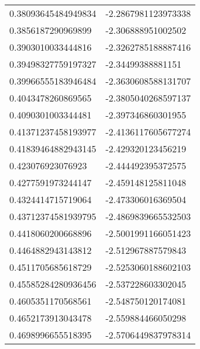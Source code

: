 \begin{supertabular}{ll}
0.38093645484949834 & -2.2867981123973338  \\
0.3856187290969899  & -2.306888951002502   \\
0.3903010033444816  & -2.3262785188887416  \\
0.39498327759197327 & -2.34499388881151    \\
0.39966555183946484 & -2.3630608588131707  \\
0.4043478260869565  & -2.3805040268597137  \\
0.4090301003344481  & -2.397346860301955   \\
0.41371237458193977 & -2.4136117605677274  \\
0.41839464882943145 & -2.429320123456219   \\
0.423076923076923   & -2.444492395372575   \\
0.4277591973244147  & -2.459148125811048   \\
0.4324414715719064  & -2.473306016369504   \\
0.43712374581939795 & -2.4869839665532503  \\
0.4418060200668896  & -2.5001991166051423  \\
0.4464882943143812  & -2.512967887579843   \\
0.4511705685618729  & -2.5253060188602103  \\
0.45585284280936456 & -2.537228603302045   \\
0.4605351170568561  & -2.548750120174081   \\
0.4652173913043478  & -2.559884466050298   \\
0.4698996655518395  & -2.5706449837978314  \\
\end{supertabular}
